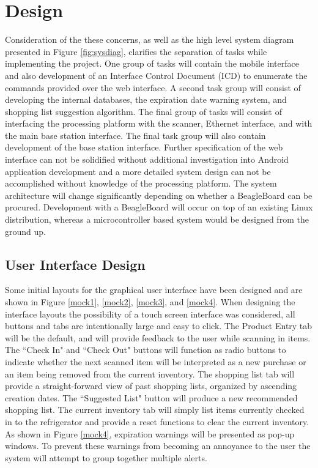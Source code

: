 \documentclass[11pt,letterpaper]{article}
\begin{document}
\section{Design}
Consideration of the these concerns, as well as the high level system diagram presented in Figure \ref{fig:sysdiag}, clarifies the separation of tasks while implementing the project. One group of tasks will contain the mobile interface and also development of an Interface Control Document (ICD) to enumerate the commands provided over the web interface. A second task group will consist of developing the internal databases, the expiration date warning system, and shopping list suggestion algorithm. The final group of tasks will consist of interfacing the processing platform with the scanner, Ethernet interface, and with the main base station interface. The final task group will also contain development of the base station interface.
\newline \quad \newline
Further specification of the web interface can not be solidified without additional investigation into Android application development and a more detailed system design can not be accomplished without knowledge of the processing platform. The system architecture will change significantly depending on whether a BeagleBoard can be procured. Development with a BeagleBoard will occur on top of an existing Linux distribution, whereas a microcontroller based system would be designed from the ground up.
\subsection{User Interface Design}
Some initial layouts for the graphical user interface have been designed and are shown in Figure \ref{mock1}, \ref{mock2}, \ref{mock3}, and \ref{mock4}. When designing the interface layouts the possibility of a touch screen interface was considered, all buttons and tabs are intentionally large and easy to click. The Product Entry tab will be the default, and will provide feedback to the user while scanning in items. The ``Check In" and ``Check Out" buttons will function as radio buttons to indicate whether the next scanned item will be interpreted as a new purchase or an item being removed from the current inventory. The shopping list tab will provide a straight-forward view of past shopping lists, organized by ascending creation dates. The ``Suggested List" button will produce a new recommended shopping list. The current inventory tab will simply list items currently checked in to the refrigerator and provide a reset functions to clear the current inventory. As shown in Figure \ref{mock4}, expiration warnings will be presented as pop-up windows. To prevent these warnings from becoming an annoyance to the user the system will attempt to group together multiple alerts.
\end{document}
